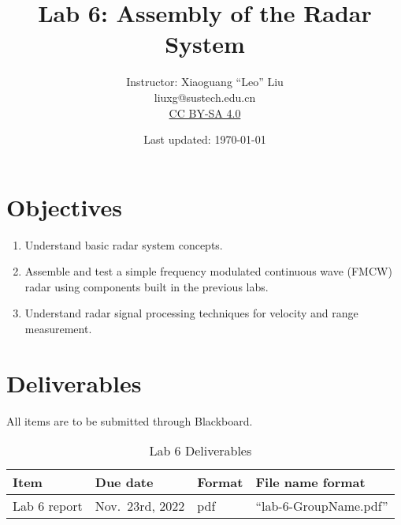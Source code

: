 \documentclass[letterpaper, 11pt]{article}
\begin{document}
\title{Lab 6: Assembly of the Radar System}
\author{Instructor: Xiaoguang ``Leo'' Liu\\liuxg@sustech.edu.cn \\
	\small \href{http://creativecommons.org/licenses/by-sa/4.0/}{CC BY-SA 4.0}}
\date{Last updated: \today}

\maketitle


\section{Objectives}

\begin{enumerate}[itemsep=0.1ex]
	\item Understand basic radar system concepts. 
	
	\item Assemble and test a simple frequency modulated continuous wave (FMCW) radar using components built in the previous labs. 
	
	\item Understand radar signal processing techniques for velocity and range measurement. 
\end{enumerate}

\section{Deliverables}
All items are to be submitted through Blackboard.  

\vspace{0.5cm}

\begin{table}[h]
	\footnotesize
	\caption{Lab 6 Deliverables}
	\renewcommand{\arraystretch}{1.2}
	\begin{tabular}{m{1in} l m{0.45in} m{2in} }
		\toprule
		\textbf{Item} & \textbf{Due date} & \textbf{Format} & \textbf{File name format} \\
		\midrule
		Lab 6 report & Nov.~23rd, 2022 & pdf & ``lab-6-GroupName.pdf''\\
		\bottomrule
	\end{tabular}
	\label{tab:deliverables}
\end{table}
\end{document}
